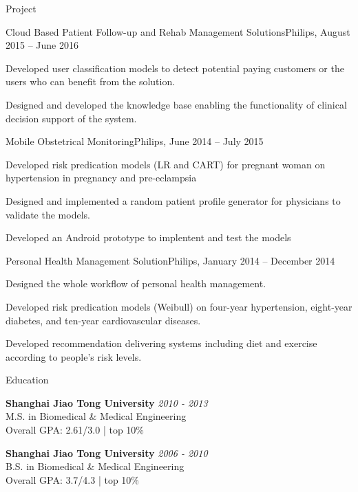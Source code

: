 \documentclass{resume} %
\begin{document}
\begin{rSection}{Project}

\begin{rSubsection}{Cloud Based Patient Follow-up and Rehab Management Solutions}{}{Philips, August 2015 – June 2016}{}
\item Developed user classification models to detect potential paying customers or the users who can benefit from the solution.
\item Designed and developed the knowledge base enabling the functionality of clinical decision support of the system.
\end{rSubsection}


\begin{rSubsection}{Mobile Obstetrical Monitoring}{}{Philips, June 2014 – July 2015}{}
\item Developed risk predication models (LR and CART) for pregnant woman on hypertension in pregnancy and pre-eclampsia
\item Designed and implemented a random patient profile generator for physicians to validate the models.
\item Developed an Android prototype to implentent and test the models
\end{rSubsection}


\begin{rSubsection}{Personal Health Management Solution}{}{Philips, January 2014 – December 2014}{}
\item Designed the whole workflow of personal health management.
\item Developed risk predication models (Weibull) on four-year hypertension, eight-year diabetes, and ten-year cardiovascular diseases.
\item Developed recommendation delivering systems including diet and exercise according to people's risk levels.
\end{rSubsection}

\end{rSection}


\begin{rSection}{Education}

{\bf Shanghai Jiao Tong University} \hfill {\em 2010 - 2013} \\ 
M.S. in Biomedical \& Medical Engineering \\
Overall GPA: 2.61/3.0 | top 10\%

{\bf Shanghai Jiao Tong University} \hfill {\em 2006 - 2010} \\ 
B.S. in Biomedical \& Medical Engineering \\
Overall GPA: 3.7/4.3 | top 10\%

\end{rSection}
\end{document}
